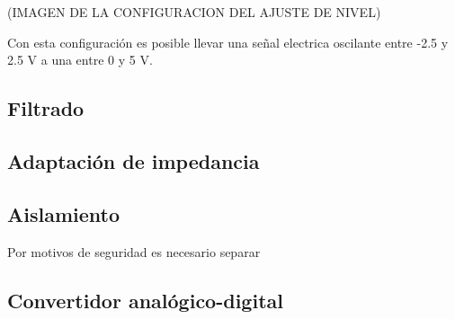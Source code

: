 (IMAGEN DE LA CONFIGURACION DEL AJUSTE DE NIVEL)

\par Con esta configuración es posible llevar una señal electrica oscilante entre -2.5 y 2.5 V
 a una entre 0 y 5 V.

\subsection{Filtrado}
\par
\subsection{Adaptación de impedancia}
\subsection{Aislamiento}
\par Por motivos de seguridad es necesario separar 







\subsection{Convertidor analógico-digital}
